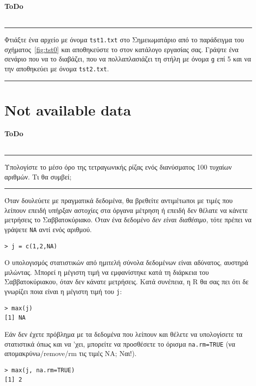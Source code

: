 \documentclass[a4paper,11pt,twocolumn,tablecaptionabove]{scrartcl}
\newenvironment{ToDo} {%
  \begin{flushright}
    \hfill
    \begin{minipage}{0.95\columnwidth}         %
    \textsf{\textbf{ToDo}} \\
      \vspace{-0.85cm}\\
      {\color{Gray}\rule[-0.1cm]{\columnwidth}{1.5pt}}} { %
      {\color{Gray} \rule[0.3cm]{\columnwidth}{1.5pt}}
    \end{minipage}
    \vspace{1em}
  \end{flushright}
  }
\begin{document}
\begin{ToDo}
  Φτιάξτε ένα αρχείο με όνομα \texttt{tst1.txt} στο Σημειωματάριο από το παράδειγμα του σχήματος~\ref{fig:tst0}
  και αποθηκεύστε το στον κατάλογο εργασίας σας. Γράψτε ένα σενάριο που να το διαβάζει, που να πολλαπλασιάζει
  τη στήλη με όνομα \texttt{g} επί 5 και να την αποθηκεύει με όνομα \texttt{tst2.txt}.\\
\end{ToDo}


\section{Not available data}

\begin{ToDo}
Υπολογίστε το μέσο όρο της τετραγωνικής ρίζας ενός διανύσματος 100 τυχαίων αριθμών. Τι θα συμβεί;
\end{ToDo}

Όταν δουλεύετε με πραγματικά δεδομένα, θα βρεθείτε αντιμέτωποι με τιμές που λείπουν επειδή υπήρξαν αστοχίες
στα όργανα μέτρηση ή επειδή δεν θέλατε να κάνετε μετρήσεις το Σαββατοκύριακο. Όταν ένα δεδομένο \emph{δεν
είναι διαθέσιμο}, τότε πρέπει να γράψετε \texttt{NA} αντί ενός αριθμού. 

\begin{Verbatim}[frame=single,gobble=0]
> j = c(1,2,NA)
\end{Verbatim}

Ο υπολογισμός στατιστικών από ημιτελή σύνολα δεδομένων είναι αδύνατος, αυστηρά μιλώντας. Μπορεί η μέγιστη τιμή
να εμφανίστηκε κατά τη διάρκεια του Σαββατοκύριακου, όταν δεν κάνατε μετρήσεις. Κατά συνέπεια, η R θα σας πει
ότι δε γνωρίζει ποια είναι η μέγιστη τιμή του \texttt{j}: 

\begin{Verbatim}[frame=single,gobble=0]
> max(j)
[1] NA
\end{Verbatim}

Εάν δεν έχετε πρόβλημα με τα δεδομένα που λείπουν και θέλετε να υπολογίσετε τα στατιστικά όπως και να 'χει,
μπορείτε να προσθέσετε το όρισμα \texttt{na.rm=TRUE} (να απομακρύνω/remove/rm τις τιμές NA; Ναι!). 

\begin{Verbatim}[frame=single,gobble=0]
> max(j, na.rm=TRUE)
[1] 2
\end{Verbatim}
\end{document}
